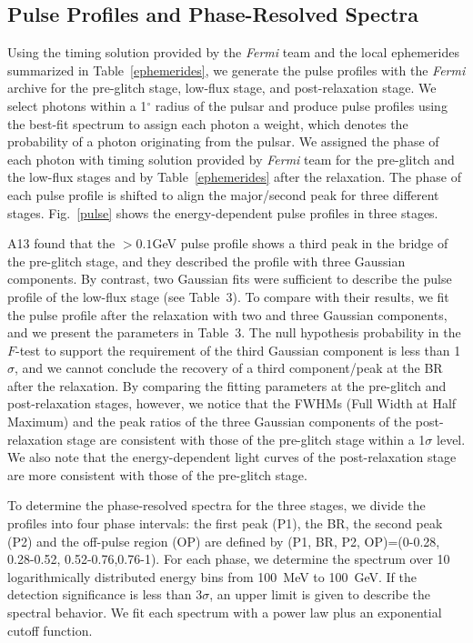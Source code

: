 \documentclass[12pt,preprint]{aastex}
\begin{document}
\subsection{Pulse Profiles and Phase-Resolved Spectra}
\label{pulsef}
Using the timing solution provided by the \emph{Fermi} team and the local ephemerides summarized in Table~\ref{ephemerides}, we generate the pulse profiles
with the \emph{Fermi} archive for the pre-glitch stage, low-flux stage, and
post-relaxation stage.  We select photons within a 1$^{\circ}$ radius of the pulsar and produce  pulse profiles using the best-fit spectrum to assign each photon a weight, which denotes the probability of a photon originating from the pulsar. 
We assigned the phase of each photon with timing solution provided by \emph{Fermi} team for the pre-glitch and the low-flux stages and by Table~\ref{ephemerides} after the relaxation.
The phase of each pulse profile is shifted to align the major/second peak for three different stages.
Fig.~\ref{pulse} shows the energy-dependent pulse profiles in three stages.

A13 found that the $>0.1$GeV pulse profile shows a third peak in the bridge of the pre-glitch stage,
and they described the profile with three Gaussian components. By contrast,
two Gaussian fits were sufficient to describe the pulse profile of the low-flux stage (see Table~3).
To compare with their results, we fit the pulse profile after the relaxation
with two and three Gaussian components, and we present the parameters in Table~3. The null hypothesis probability in the $F$-test to support the requirement of the third Gaussian component is less than 1$\sigma$, and we cannot conclude the recovery of a third component/peak at the BR after the
relaxation. By comparing the fitting parameters at the pre-glitch and
post-relaxation stages, however, we notice that the FWHMs (Full Width at Half Maximum) and the peak ratios of the three Gaussian components of the post-relaxation stage
are consistent with those of the pre-glitch stage within a  1$\sigma$ level. We also note that the energy-dependent light
curves of the post-relaxation stage are  more consistent with those of the pre-glitch stage. 

To determine the phase-resolved spectra for the  three stages, we divide the profiles  into four phase intervals: the first peak (P1), the BR, the second peak (P2) and the off-pulse region (OP) are defined by (P1, BR, P2, OP)=(0-0.28, 0.28-0.52, 0.52-0.76,0.76-1).  
For each phase, we determine the spectrum over 10 logarithmically distributed energy bins from 100~MeV to 100~GeV.
If the detection significance is less than 3$\sigma$, an upper limit is given to describe the spectral behavior.
We fit each spectrum with a power law plus an exponential cutoff function.
\end{document}
